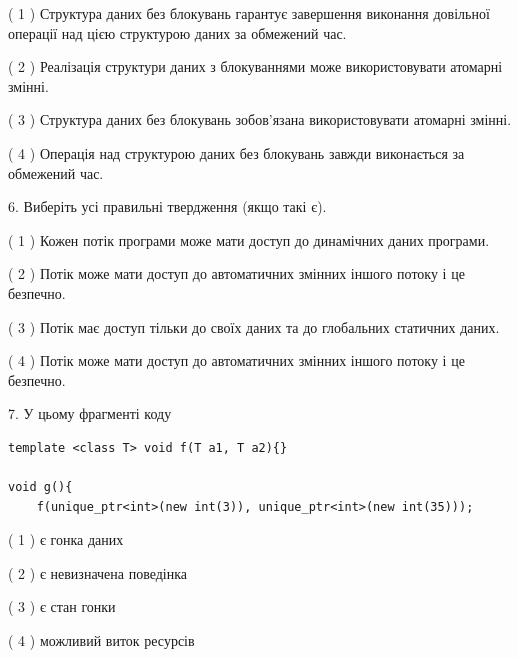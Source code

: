 \documentclass[12pt, ukrainian]{article}
\begin{document}
\begin {large}
{( 1 ) Структура даних без блокувань гарантує завершення виконання довільної операції над цією структурою даних за обмежений час.%

( 2 ) Реалізація структури даних з блокуваннями може використовувати атомарні змінні.%

( 3 ) Структура даних без блокувань зобов’язана використовувати атомарні змінні.%

( 4 ) Операція над структурою даних без блокувань завжди виконається за обмежений час.%
\newpage



\vspace{5mm}
6. Виберіть усі правильні твердження (якщо такі є).\par
\vspace{2mm}

( 1 ) Кожен потік програми може мати доступ до динамічних даних програми.%

( 2 ) Потік може мати доступ до автоматичних змінних іншого потоку і це безпечно.%

( 3 ) Потік має доступ тільки до своїх даних та до глобальних статичних даних.%

( 4 ) Потік може мати доступ до автоматичних змінних іншого потоку і це безпечно.%


\vspace{5mm}
7. У цьому фрагменті коду
\begin{verbatim}
template <class T> void f(T a1, T a2){}

void g(){
    f(unique_ptr<int>(new int(3)), unique_ptr<int>(new int(35)));
\end{verbatim}

( 1 ) є гонка даних%

( 2 ) є невизначена поведінка%

( 3 ) є стан гонки%

( 4 ) можливий виток ресурсів%
}
\end {large}
\end{document}
